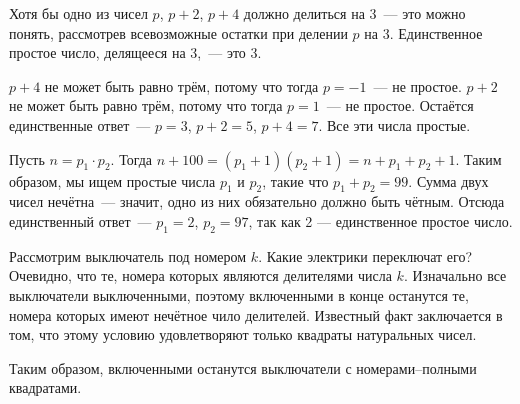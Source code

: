 \begin{itemize}

\itA Хотя бы одно из чисел $p$, $p+2$, $p+4$ должно делиться на 3~— это можно понять, рассмотрев всевозможные остатки при делении $p$ на 3. Единственное простое число, делящееся на 3,~— это 3.

$p+4$ не может быть равно трём, потому что тогда $p=-1$~— не простое. $p+2$ не может быть равно трём, потому что тогда $p=1$~— не простое. Остаётся единственные ответ~— $p=3$, $p+2 = 5$, $p+4 = 7$. Все эти числа простые.

\itB Пусть $n = p_1 \cdot p_2$. Тогда $n+100 = (p_1 + 1)(p_2 + 1) = n + p_1 + p_2 + 1$. Таким образом, мы ищем простые числа $p_1$ и $p_2$, такие что $p_1 + p_2 = 99$. Сумма двух чисел нечётна~— значит, одно из них обязательно должно быть чётным. Отсюда единственный ответ~— $p_1 = 2$, $p_2 = 97$, так как 2 — единственное простое число.

\itC Рассмотрим выключатель под номером $k$. Какие электрики переключат его? Очевидно, что те, номера которых являются делителями числа $k$. Изначально все выключатели выключенными, поэтому включенными в конце останутся те, номера которых имеют нечётное чило делителей. Известный факт заключается в том, что этому условию удовлетворяют только квадраты натуральных чисел.

Таким образом, включенными останутся выключатели с номерами–полными квадратами.
\end{itemize}
